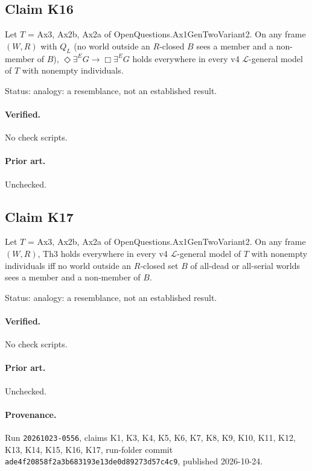 \documentclass{article}
\begin{document}
\subsection*{Claim K16}

Let $T$ = Ax3, Ax2b, Ax2a of OpenQuestions.Ax1GenTwoVariant2. On any frame $(W,R)$ with $Q_L$ (no world outside an $R$-closed $B$ sees a member and a non-member of $B$), $\Diamond\exists^E G\to\Box\exists^E G$ holds everywhere in every v4 $\mathcal L$-general model of $T$ with nonempty individuals.

Status: analogy: a resemblance, not an established result.

\paragraph{Verified.}
No check scripts.

\paragraph{Prior art.} Unchecked.

\subsection*{Claim K17}

Let $T$ = Ax3, Ax2b, Ax2a of OpenQuestions.Ax1GenTwoVariant2. On any frame $(W,R)$, Th3 holds everywhere in every v4 $\mathcal L$-general model of $T$ with nonempty individuals iff no world outside an $R$-closed set $B$ of all-dead or all-serial worlds sees a member and a non-member of $B$.

Status: analogy: a resemblance, not an established result.

\paragraph{Verified.}
No check scripts.

\paragraph{Prior art.} Unchecked.

\paragraph{Provenance.}
Run \texttt{20261023-0556}, claims K1, K3, K4, K5, K6, K7, K8, K9, K10, K11, K12, K13, K14, K15, K16, K17, run-folder commit \texttt{ade4f20858f2a3b683193e13de0d89273d57c4c9}, published 2026-10-24.
\end{document}
